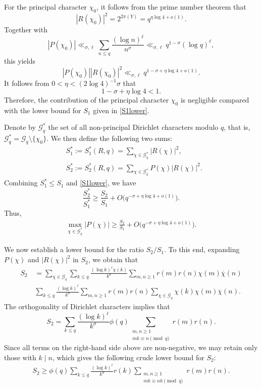 \documentclass[12pt,reqno]{amsart}
\theoremstyle{definition}
\numberwithin{equation}{section}
\newcommand{\bg}{\big}
\newcommand{\inv}{^{-1}}
\newcommand{\mcg}{\mathcal{G}}
\newcommand{\ol}{\overline}
\begin{document}
\par
For the principal character \(\chi_0\), it follows from the prime number theorem that
\[
|R(\chi_0)|^2 = 2^{2\pi(Y)} = q^{\eta\log 4+o(1)}.
\]
Together with
\[
|P(\chi_0)| \ll_{\sigma,\ell} \sum_{n \le q} \frac{(\log n)^\ell}{n^\sigma} \ll_{\sigma,\ell} q^{1-\sigma}(\log q )^\ell,
\]
this yields
\[
|P(\chi_0)||R(\chi_0)|^2 \ll_{\sigma,\ell} q^{1-\sigma+\eta\log 4+o(1)}.
\]
It follows from \(0 < \eta < (2\log 4)\inv \sigma\) that 
\[
1-\sigma+\eta\log4 <1.
\]
Therefore, the contribution of the principal character \(\chi_0\) is negligible compared with the lower bound for \(S_1\) given in \eqref{S1lower}.
\par
Denote by \(\mathcal{G}_q^\ast\) the set of all non-principal Dirichlet characters modulo \(q\), that is, \(\mcg_q^\ast = \mcg_q \setminus \{\chi_0\}\). We then define the following two sums:
\begin{align*}
    & S_1^\ast := S_1^\ast(R,q) = \sum_{\chi \in \mcg_q^\ast}|R(\chi)|^2, \\
    & S_2^\ast := S_2^\ast(R,q) = \sum_{\chi \in \mcg_q^\ast}P(\chi) |R(\chi)|^2.
\end{align*}
Combining \(S_1^\ast \le S_1\) and \eqref{S1lower}, we have
\[
\frac{S_2^\ast}{S_1^\ast} \ge \frac{S_2}{S_1} + O\bg(q^{-\sigma+\eta\log 4+o(1)} \bg).
\]
Thus,
\begin{align}
    \label{max1}
    \max_{\chi\in \mcg_q^\ast} |P(\chi)| \ge \frac{S_2}{S_1} + O\bg(q^{-\sigma+\eta\log 4+o(1)} \bg).
\end{align}
\par
We now establish a lower bound for the ratio \(S_2/S_1\). To this end, expanding \(P(\chi)\) and \(|R(\chi)|^2\) in \(S_2\), we obtain that 
\begin{align*}
    S_2 &\, = \sum_{\chi \in \mcg_q}\sum_{k \le q}\frac{(\log k )^\ell \chi(k)}{k^\sigma} \sum_{m,n\ge 1} r(m)r(n)\chi(m)\ol\chi(n)  \\
    &\, \sum_{k \le q}\frac{(\log k )^\ell}{k^\sigma}\sum_{m,n\ge 1} r(m)r(n)  \sum_{\chi \in \mcg_q}\chi(k)\chi(m)\ol\chi(n).
\end{align*}
The orthogonality of Dirichlet characters implies that
\[
    S_2 = \sum_{k \le q}\frac{(\log k )^\ell}{k^\sigma} \phi(q) \sum_{\substack{m,n \ge 1 \\ mk \equiv n\pmod q}} r(m)r(n).
\]
Since all terms on the right-hand side above are non-negative, we may retain only those with \(k\mid n\), which gives the following crude lower bound for \(S_2\):
\begin{align}
    \label{S2lower}
    S_2 \ge \phi(q)\sum_{k \le q}\frac{(\log k )^\ell}{k^\sigma}r(k)\sum_{\substack{m,n \ge 1 \\ mk \equiv nk \pmod q}} r(m)r(n).
\end{align}
\end{document}
